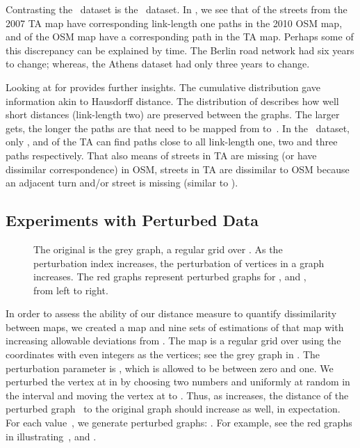 Contrasting the \bsmall\ dataset is the \asmall\ dataset.  In \asmall, we see
that  of the streets from the 2007
TA map have corresponding link-length one paths in the 2010 OSM map, and 
of the OSM map
have a corresponding path in the TA map. Perhaps some of this discrepancy
can be explained by time.  The Berlin
road network had six years to change; whereas, the Athens dataset had only three
years to change.

Looking at  for  provides further insights.  The cumulative
distribution  gave
information akin to Hausdorff distance.  The distribution of 
describes how well short distances (link-length two) are preserved between the 
graphs.  The larger  gets, the longer
the paths are that need to be mapped from
 to~.  In the \blarge\ dataset, only ,  and  of the TA 
can find paths close to all
link-length one, two and three paths respectively. That also means  of streets in TA
are missing (or have dissimilar correspondence) in OSM,  streets in TA are dissimilar 
to OSM  because an adjacent turn and/or street is missing (similar to ).


\subsection{Experiments with Perturbed Data}
\label{subsec-controlled}


\begin{figure}[hb]
\centering
{}
\hspace{1cm}
\hspace{1cm}
\caption{The original  is the grey graph, a
regular grid over . As the perturbation
index  increases, the perturbation of vertices in a graph increases.
The red graphs represent perturbed graphs for ,  and , 
from left to right.}
\label{fig-pGraphs}
\end{figure}


In order to assess the ability of our distance measure to quantify dissimilarity 
between 
maps, we created a map  and nine sets of estimations of that map with
increasing allowable deviations from .  The map  is a regular grid over
 using the coordinates with even integers as the
vertices; see the grey graph in .
The perturbation parameter is , which is allowed to be between zero and one.  
We perturbed
the vertex at
 in  by choosing two numbers  and  uniformly at random in the
interval  and moving the vertex at  to .
Thus, as  increases, the distance of the perturbed graph~ to the 
original graph  should increase as well, in expectation.  For each
value~, 
we generate  perturbed graphs: . For example,
see 
the red graphs in  illustrating~, and .


